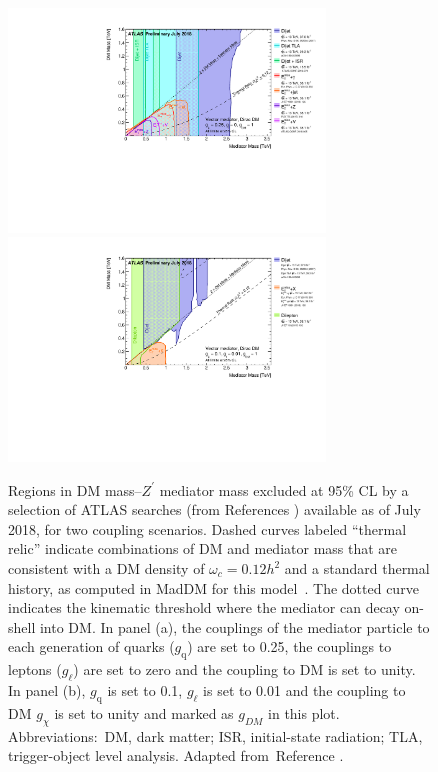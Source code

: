 \documentclass{ar-1col}
\newcommand{\chiDM}{\ensuremath{\chi}\xspace}
\newcommand{\gDM}{\ensuremath{g_{\chiDM}}\xspace}
\newcommand{\gdm}{\gDM}
\newcommand{\gl}{$g_{\ell}$\xspace}
\newcommand{\gq}{$g_{\mathrm{q}}$\xspace}
\newcommand{\Zprime}{\ensuremath{{Z}^\prime}\xspace}
\begin{document}
{\begin{figure}[!htpb]
\includegraphics[width=0.75\textwidth]{figures/ATLAS_DarkMatter_Summary_Vector.pdf}\\
\includegraphics[width=0.75\textwidth]{figures/ATLAS_DarkMatter_Summary_Vector_ModifiedCoupling.pdf}
\caption{Regions in DM mass--\Zprime mediator mass
excluded at 95\% CL by a selection of ATLAS searches 
(from References \cite{ATLAS:2016bvn,Aaboud:2018fzt,Aaboud:2017yvp,
Aaboud:2017phn,ATLAS-CONF-2018-005,Aaboud:2017bja,Aaboud:2017dor,
Aaboud:2017buh}) 
available as of July 2018, for two coupling scenarios. Dashed curves labeled ``thermal
relic'' indicate combinations of DM and mediator mass
that are consistent with a DM density of $\omega_c = 0.12
h^2$ and a standard thermal history, as computed in MadDM for this
model~\cite{Backovic:2015cra}. The dotted curve indicates the
kinematic threshold where the mediator can decay on-shell into
DM. 
In panel (a), the couplings of the mediator particle to each generation
of quarks (\gq) are set to 0.25, the couplings to leptons (\gl)
are set to zero and the coupling to DM is set to unity. 
In panel (b), \gq is set to 0.1, \gl is set to 0.01
and the coupling to DM \gdm is set to unity and marked as $g_{DM}$ in this plot.
Abbreviations:\ DM, dark matter; ISR, initial-state radiation; 
TLA, trigger-object level analysis. Adapted from~Reference .
}
\label{fig:sensitivityComparison}
\end{figure}

}
\end{document}
